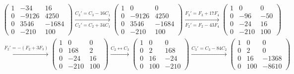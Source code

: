 \begin{ejercicio}
\begin{enumerate}
\begin{multline*}
\begin{pmatrix}
                1 & -34 & 16 \\
                0 & -9126 & 4250 \\
                0 & 3546 & -1684 \\
                0 & -210 & 100
            \end{pmatrix}
            \xrightarrow[C_2'=C_2+34C_1]{C_3'=C_3-16C_1}
            \begin{pmatrix}
                1 & 0 & 0 \\
                0 & -9126 & 4250 \\
                0 & 3546 & -1684 \\
                0 & -210 & 100
            \end{pmatrix}
            \xrightarrow[F_2'=F_2-43F_4]{F_3'=F_3+17F_4}
            \begin{pmatrix}
                1 & 0 & 0 \\
                0 & -96 & -50 \\
                0 & -24 & 16 \\
                0 & -210 & 100
            \end{pmatrix}
        \end{multline*}
        \begin{multline*}
            \xrightarrow{F_2'=-(F_2+3F_3)}
            \begin{pmatrix}
                1 & 0 & 0 \\
                0 & 168 & 2 \\
                0 & -24 & 16 \\
                0 & -210 & 100
            \end{pmatrix}
            \xrightarrow{C_2\leftrightarrow C_3}
            \begin{pmatrix}
                1 & 0 & 0 \\
                0 & 2 & 168 \\
                0 & 16 & -24 \\
                0 & 100 & -210
            \end{pmatrix}
            \xrightarrow{C_3'=C_3-84C_2}
            \begin{pmatrix}
                1 & 0 & 0 \\
                0 & 2 & 0 \\
                0 & 16 & -1368 \\
                0 & 100 & -8610
            \end{pmatrix}\\

\end{multline*}
\end{enumerate}
\end{ejercicio}
